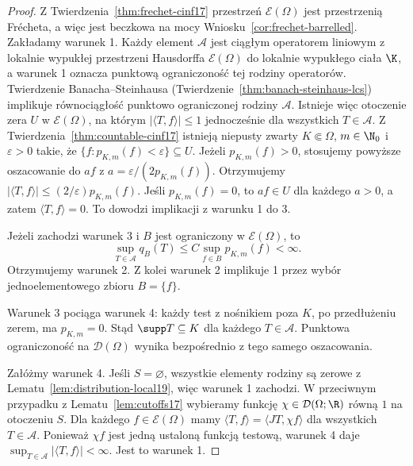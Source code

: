 \begin{proof}
Z Twierdzenia~\ref{thm:frechet-cinf17} przestrzeń
$\mathcal E(\Omega)$ jest przestrzenią Frécheta, a więc
jest beczkowa na mocy Wniosku~\ref{cor:frechet-barrelled}.
Zakładamy warunek 1. Każdy element $\mathcal A$ jest
ciągłym operatorem liniowym z lokalnie wypukłej
przestrzeni Hausdorffa $\mathcal E(\Omega)$ do
lokalnie wypukłego ciała $\K$, a warunek 1 oznacza
punktową ograniczoność tej rodziny operatorów.
Twierdzenie Banacha--Steinhausa
(Twierdzenie~\ref{thm:banach-steinhaus-lcs})
implikuje równociągłość punktowo ograniczonej rodziny
$\mathcal A$. Istnieje więc otoczenie zera $U$ w
$\mathcal E(\Omega)$, na którym
$|\langle T,f\rangle|\le1$ jednocześnie dla wszystkich
$T\in\mathcal A$.
Z Twierdzenia~\ref{thm:countable-cinf17} istnieją
niepusty zwarty $K\Subset\Omega$, $m\in\N_0$ i
$\varepsilon>0$ takie, że
$\{f:p_{K,m}(f)<\varepsilon\}\subseteq U$.
Jeżeli $p_{K,m}(f)>0$, stosujemy powyższe oszacowanie
do $af$ z $a=\varepsilon/(2p_{K,m}(f))$.
Otrzymujemy $|\langle T,f\rangle|\le(2/\varepsilon)p_{K,m}(f)$.
Jeśli $p_{K,m}(f)=0$, to $af\in U$ dla każdego $a>0$,
a zatem $\langle T,f\rangle=0$.
To dowodzi implikacji z warunku 1 do 3.

Jeżeli zachodzi warunek 3 i $B$ jest ograniczony
w $\mathcal E(\Omega)$, to
\[
 \sup_{T\in\mathcal A}q_B(T)
 \le C\sup_{f\in B}p_{K,m}(f)<\infty.
\]
Otrzymujemy warunek 2. Z kolei warunek 2 implikuje 1
przez wybór jednoelementowego zbioru $B=\{f\}$.

Warunek 3 pociąga warunek 4: każdy test z nośnikiem
poza $K$, po przedłużeniu zerem, ma $p_{K,m}=0$.
Stąd $\supp T\subseteq K$ dla każdego $T\in\mathcal A$.
Punktowa ograniczoność na $\mathcal D(\Omega)$
wynika bezpośrednio z tego samego oszacowania.

Załóżmy warunek 4. Jeśli $S=\varnothing$, wszystkie
elementy rodziny są zerowe z Lematu~\ref{lem:distribution-local19},
więc warunek 1 zachodzi. W przeciwnym przypadku
z Lematu~\ref{lem:cutoffs17} wybieramy funkcję
$\chi\in\mathcal D(\Omega;\R)$ równą $1$ na otoczeniu $S$.
Dla każdego $f\in\mathcal E(\Omega)$ mamy
$\langle T,f\rangle=\langle JT,\chi f\rangle$
dla wszystkich $T\in\mathcal A$. Ponieważ $\chi f$
jest jedną ustaloną funkcją testową, warunek 4 daje
$\sup_{T\in\mathcal A}|\langle T,f\rangle|<\infty$.
Jest to warunek 1.
\end{proof}
